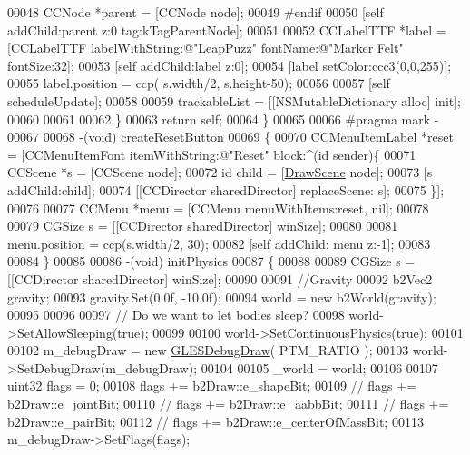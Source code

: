 \begin{DoxyCode}
00048         CCNode *parent = [CCNode node];
00049 \textcolor{preprocessor}{#endif}
00050 \textcolor{preprocessor}{}        [\textcolor{keyword}{self} addChild:parent z:0 tag:kTagParentNode];
00051     
00052         CCLabelTTF *label = [CCLabelTTF labelWithString:@"LeapPuzz" fontName:@"Marker Felt" fontSize:32];
00053         [\textcolor{keyword}{self} addChild:label z:0];
00054         [label setColor:ccc3(0,0,255)];
00055         label.position = ccp( s.width/2, s.height-50);
00056         
00057         [\textcolor{keyword}{self} scheduleUpdate];
00058         
00059         trackableList = [[NSMutableDictionary alloc] init];
00060              
00061         
00062     \}
00063     \textcolor{keywordflow}{return} \textcolor{keyword}{self};
00064 \}
00065 
00066 \textcolor{preprocessor}{#pragma mark -}
00067 \textcolor{preprocessor}{}
00068 -(void) createResetButton
00069 \{
00070     CCMenuItemLabel *reset = [CCMenuItemFont itemWithString:@"Reset" block:^(id sender)\{
00071         CCScene *s = [CCScene node];
00072         id child = [\hyperlink{interface_draw_scene}{DrawScene} node];
00073         [s addChild:child];
00074         [[CCDirector sharedDirector] replaceScene: s];
00075     \}];
00076     
00077     CCMenu *menu = [CCMenu menuWithItems:reset, nil];
00078     
00079     CGSize s = [[CCDirector sharedDirector] winSize];
00080     
00081     menu.position = ccp(s.width/2, 30);
00082     [\textcolor{keyword}{self} addChild: menu z:-1];
00083     
00084 \}
00085 
00086 -(void) initPhysics
00087 \{
00088     
00089     CGSize s = [[CCDirector sharedDirector] winSize];
00090     
00091     \textcolor{comment}{//Gravity}
00092     b2Vec2 gravity;
00093     gravity.Set(0.0f, -10.0f);
00094     world = \textcolor{keyword}{new} b2World(gravity);
00095     
00096     
00097     \textcolor{comment}{// Do we want to let bodies sleep?}
00098     world->SetAllowSleeping(\textcolor{keyword}{true});
00099     
00100     world->SetContinuousPhysics(\textcolor{keyword}{true});
00101     
00102     m\_debugDraw = \textcolor{keyword}{new} \hyperlink{class_g_l_e_s_debug_draw}{GLESDebugDraw}( PTM\_RATIO );
00103     world->SetDebugDraw(m\_debugDraw);
00104     
00105     \_world = world;
00106     
00107     uint32 flags = 0;
00108     flags += b2Draw::e\_shapeBit;
00109     \textcolor{comment}{//      flags += b2Draw::e\_jointBit;}
00110     \textcolor{comment}{//      flags += b2Draw::e\_aabbBit;}
00111     \textcolor{comment}{//      flags += b2Draw::e\_pairBit;}
00112     \textcolor{comment}{//      flags += b2Draw::e\_centerOfMassBit;}
00113     m\_debugDraw->SetFlags(flags);

\end{DoxyCode}
